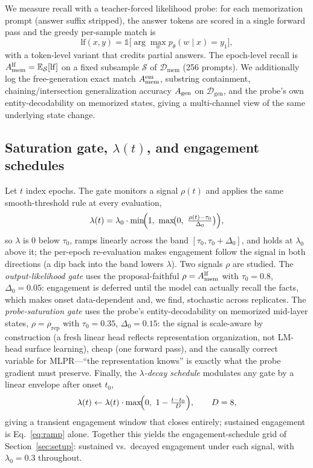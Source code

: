 We measure recall with a teacher-forced likelihood probe: for
each memorization prompt (answer suffix stripped), the answer tokens are
scored in a single forward pass and the greedy per-sample match is
\begin{equation}
  \mathrm{lf}(x, y) = \mathbb{1}\bigl[
    \arg\max_w p_\theta(w \mid x) = y_1 \bigr],
  \label{eq:lf}
\end{equation}
with a token-level variant that credits partial answers. The epoch-level
recall is $A_{\mathrm{mem}}^{\mathrm{lf}} = \mathbb{E}_{\mathcal{S}}[\mathrm{lf}]$ on a fixed
subsample $\mathcal{S}$ of $\mathcal{D}_{\mathrm{mem}}$ (256 prompts).
We additionally log the free-generation exact match
$A_{\mathrm{mem}}^{\mathrm{em}}$, substring containment, chaining/intersection generalization
accuracy $A_{\mathrm{gen}}$ on $\mathcal{D}_{\mathrm{gen}}$, and the probe's own
entity-decodability on memorized states, giving a multi-channel view
of the same underlying state change.

\subsection{Saturation gate, $\lambda(t)$, and engagement schedules}
\label{sec:method:gate}

Let $t$ index epochs. The gate monitors a signal $\rho(t)$ and applies
the same smooth-threshold rule at every evaluation,
\begin{equation}
  \lambda(t) = \lambda_0 \cdot
    \min\!\Bigl(1,\ \max\!\bigl(0,\ \tfrac{\rho(t) - \tau_0}{\Delta_0}\bigr)\Bigr),
  \label{eq:ramp}
\end{equation}
so $\lambda$ is $0$ below $\tau_0$, ramps linearly across the band
$[\tau_0, \tau_0{+}\Delta_0]$, and holds at $\lambda_0$ above it; the
per-epoch re-evaluation makes engagement follow the signal in both
directions (a dip back into the band lowers $\lambda$). Two signals
$\rho$ are studied. The \emph{output-likelihood gate} uses the
proposal-faithful $\rho=A_{\mathrm{mem}}^{\mathrm{lf}}$ with $\tau_0{=}0.8$,
$\Delta_0{=}0.05$: engagement is deferred until the model can actually
recall the facts, which makes onset data-dependent and, we find,
stochastic across replicates. The \emph{probe-saturation gate} uses
the probe's entity-decodability on memorized mid-layer states,
$\rho=\rho_{\mathrm{rep}}$ with $\tau_0{=}0.35$,
$\Delta_0{=}0.15$: the signal is scale-aware by construction (a fresh
linear head reflects representation organization, not LM-head surface
learning), cheap (one forward pass), and the causally correct variable
for MLPR---``the representation knows'' is exactly what the probe
gradient must preserve. Finally, the \emph{$\lambda$-decay schedule}
modulates any gate by a linear envelope after onset $t_0$,
\begin{equation}
  \lambda(t) \leftarrow \lambda(t) \cdot
    \max\!\Bigl(0,\ 1 - \tfrac{t - t_0}{D}\Bigr),
  \qquad D = 8,
  \label{eq:decay}
\end{equation}
giving a transient engagement window that closes entirely; sustained
engagement is Eq.~\ref{eq:ramp} alone. Together this yields the
engagement-schedule grid of Section~\ref{sec:setup}: sustained vs.\
decayed engagement under each signal, with $\lambda_0{=}0.3$
throughout.

